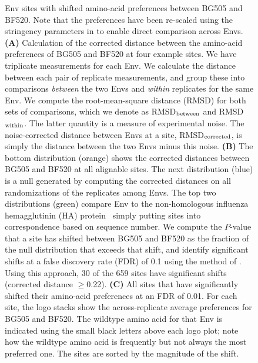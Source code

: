 \documentclass[9pt]{elife}
\begin{document}
\begin{figure}
\begin{fullwidth}
\caption{\label{fig:prefsdist}
Env sites with shifted amino-acid preferences between BG505 and BF520.
Note that the preferences have been re-scaled using the stringency parameters in  to enable direct comparison across Envs.
{\bf (A)} Calculation of the corrected distance between the amino-acid preferences of BG505 and BF520 at four example sites.
We have triplicate measurements for each Env.
We calculate the distance between each pair of replicate measurements, and group these into comparisons \emph{between} the two Envs and \emph{within} replicates for the same Env.
We compute the root-mean-square distance (RMSD) for both sets of comparisons, which we denote as RMSD$_{\rm{between}}$ and RMSD$_{\rm{within}}$.
The latter quantity is a measure of experimental noise.
The noise-corrected distance between Envs at a site, RMSD$_{\rm{corrected}}$, is simply the distance between the two Envs minus this noise.
{\bf (B)} The bottom distribution (orange) shows the corrected distances between BG505 and BF520 at all alignable sites.
The next distribution (blue) is a null generated by computing the corrected distances on all randomizations of the replicates among Envs.
The top two distributions (green) compare Env to the non-homologous influenza hemagglutinin (HA) protein~\citep{doud2016accurate} simply putting sites into correspondence based on sequence number.
We compute the $P$-value that a site has shifted between BG505 and BF520 as the fraction of the null distribution that exceeds that shift, and identify significant shifts at a false discovery rate (FDR) of 0.1 using the method of \citet{benjamini1995controlling}.
Using this approach, 30 of the 659 sites have significant shifts (corrected distance $\ge$0.22).
{\bf (C)} All sites that have significantly shifted their amino-acid preferences at an FDR of 0.01.
For each site, the logo stacks show the across-replicate average preferences for BG505 and BF520.
The wildtype amino acid for that Env is indicated using the small black letters above each logo plot; note how the wildtype amino acid is frequently but not always the most preferred one.
The sites are sorted by the magnitude of the shift.
}
\end{fullwidth}
\end{figure}
\end{document}

